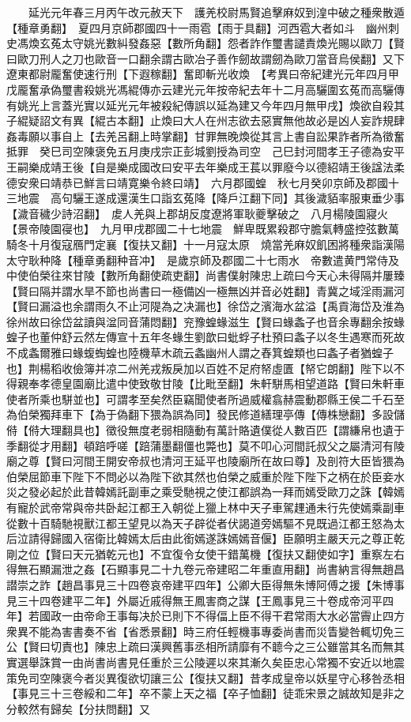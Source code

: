 　　延光元年春三月丙午改元赦天下　護羌校尉馬賢追擊麻奴到湟中破之種衆散遁【種章勇翻】　夏四月京師郡國四十一雨雹【雨于具翻】河西雹大者如斗　幽州刺史馮煥玄菟太守姚光數糾發姦惡【數所角翻】怨者詐作璽書譴責煥光賜以歐刀【賢曰歐刀刑人之刀也歐音一口翻余謂古歐冶子善作劒故謂劒為歐刀當音烏侯翻】又下遼東都尉龎奮使速行刑【下遐稼翻】奮即斬光收煥　【考異曰帝紀建光元年四月甲戊龎奮承偽璽書殺姚光馮緄傳亦云建光元年按帝紀去年十二月高驪圍玄菟而高驪傳有姚光上言蓋光實以延光元年被殺紀傳誤以延為建又今年四月無甲戌】煥欲自殺其子緄疑詔文有異【緄古本翻】止煥曰大人在州志欲去惡實無他故必是凶人妄詐規肆姦毒願以事自上【去羌呂翻上時掌翻】甘罪無晚煥從其言上書自訟果詐者所為徵奮抵罪　癸巳司空陳褒免五月庚戌宗正彭城劉授為司空　己巳封河間孝王子德為安平王嗣樂成靖王後【自是樂成國改曰安平去年樂成王萇以罪廢今以德紹靖王後諡法柔德安衆曰靖恭已鮮言曰靖寛樂令終曰靖】　六月郡國蝗　秋七月癸卯京師及郡國十三地震　高句驪王遂成還漢生口詣玄菟降【降戶江翻下同】其後濊貊率服東垂少事【濊音穢少詩沼翻】　䖍人羌與上郡胡反度遼將軍耿夔擊破之　八月楊陵園寢火【景帝陵園寑也】　九月甲戌郡國二十七地震　鮮卑既累殺郡守膽氣轉盛控弦數萬騎冬十月復寇鴈門定襄【復扶又翻】十一月寇太原　燒當羌麻奴飢困將種衆詣漢陽太守耿种降【種章勇翻种音冲】　是歲京師及郡國二十七雨水　帝數遣黄門常侍及中使伯榮往來甘陵【數所角翻使疏吏翻】尚書僕射陳忠上疏曰今天心未得隔并屢臻【賢曰隔并謂水旱不節也尚書曰一極備凶一極無凶并音必姓翻】青冀之域淫雨漏河【賢曰漏溢也余謂雨久不止河隄為之决漏也】徐岱之濱海水盆溢【禹貢海岱及淮為徐州故曰徐岱盆讀與湓同音蒲悶翻】兖豫蝗蝝滋生【賢曰蝝螽子也音余專翻余按蝝蝗子也董仲舒云然左傳宣十五年冬蝝生劉歆曰蚍蜉子杜預曰螽子以冬生遇寒而死故不成螽爾雅曰蝝蝮蜪蝗也陸機草木疏云螽幽州人謂之舂箕蝗類也曰螽子者猶蝗子也】荆楊稻收儉簿并凉二州羌戎叛戾加以百姓不足府帑虛匱【帑它朗翻】陛下以不得親奉孝德皇園廟比遣中使致敬甘陵【比毗至翻】朱軒駢馬相望道路【賢曰朱軒車使者所乘也駢並也】可謂孝至矣然臣竊聞使者所過威權翕赫震動郡縣王侯二千石至為伯榮獨拜車下【為于偽翻下猥為誤為同】發民修道繕理亭傳【傳株戀翻】多設儲偫【偫大理翻具也】徵役無度老弱相隨動有萬計賂遺僕從人數百匹【謂縑帛也遺于季翻從才用翻】頓踣呼嗟【踣蒲墨翻僵也斃也】莫不叩心河間託叔父之屬清河有陵廟之尊【賢曰河間王開安帝叔也清河王延平也陵廟所在故曰尊】及剖符大臣皆猥為伯榮屈節車下陛下不問必以為陛下欲其然也伯榮之威重於陛下陛下之柄在於臣妾水災之發必起於此昔韓嫣託副車之乘受馳視之使江都誤為一拜而嫣受歐刀之誅【韓嫣有寵於武帝常與帝共卧起江都王入朝從上獵上林中天子車駕䟆通未行先使嫣乘副車從數十百騎馳視獸江都王望見以為天子辟從者伏謁道旁嫣驅不見既過江都王怒為太后泣請得歸國入宿衛比韓嫣太后由此銜嫣遂誅嫣嫣音偃】臣願明主嚴天元之尊正乾剛之位【賢曰天元猶乾元也】不宜復令女使干錯萬機【復扶又翻使如字】重察左右得無石顯漏泄之姦【石顯事見二十九卷元帝建昭二年重直用翻】尚書納言得無趙昌譛崇之詐【趙昌事見三十四卷哀帝建平四年】公卿大臣得無朱博阿傅之援【朱博事見三十四卷建平二年】外屬近戚得無王鳳害商之謀【王鳳事見三十卷成帝河平四年】若國政一由帝命王事每决於已則下不得偪上臣不得干君常雨大水必當霽止四方衆異不能為害書奏不省【省悉景翻】時三府任輕機事專委尚書而災眚變咎輒切免三公【賢曰切責也】陳忠上疏曰漢興舊事丞相所請靡有不聼今之三公雖當其名而無其實選舉誅賞一由尚書尚書見任重於三公陵遲以來其漸久矣臣忠心常獨不安近以地震策免司空陳褒今者災異復欲切讓三公【復扶又翻】昔孝成皇帝以妖星守心移咎丞相【事見三十三卷綏和二年】卒不蒙上天之福【卒子恤翻】徒乖宋景之誠故知是非之分較然有歸矣【分扶問翻】又